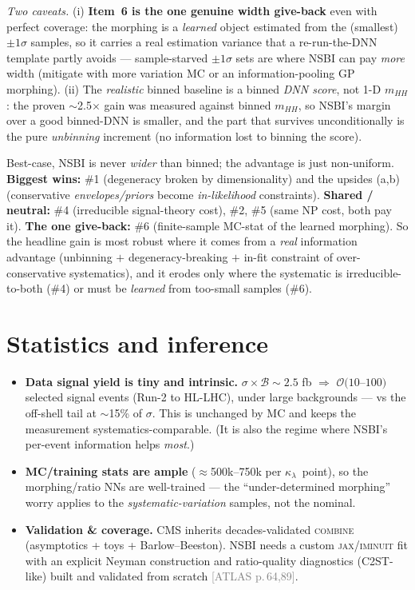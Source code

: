 \documentclass[11pt]{article}
\newcommand{\kl}{\ensuremath{\kappa_\lambda}}
\newcommand{\mhh}{\ensuremath{m_{HH}}}
\newcommand{\pA}[1]{\textcolor{gray}{\small[ATLAS p.\,#1]}}
\begin{document}
\noindent\emph{Two caveats.} (i) \textbf{Item~6 is the one genuine width give-back} even with perfect coverage: the
morphing is a \emph{learned} object estimated from the (smallest) $\pm1\sigma$ samples, so it carries a real
estimation variance that a re-run-the-DNN template partly avoids --- sample-starved $\pm1\sigma$ sets are where NSBI
can pay \emph{more} width (mitigate with more variation MC or an information-pooling GP morphing). (ii) The
\emph{realistic} binned baseline is a binned \emph{DNN score}, not 1-D \mhh: the proven $\sim$2.5$\times$ gain was
measured against binned \mhh, so NSBI's margin over a good binned-DNN is smaller, and the part that survives
unconditionally is the pure \emph{unbinning} increment (no information lost to binning the score).

\begin{takeaway}
Best-case, NSBI is never \emph{wider} than binned; the advantage is just non-uniform. \textbf{Biggest wins:} \#1
(degeneracy broken by dimensionality) and the upsides (a,b) (conservative \emph{envelopes/priors} become
\emph{in-likelihood} constraints). \textbf{Shared / neutral:} \#4 (irreducible signal-theory cost), \#2, \#5 (same
NP cost, both pay it). \textbf{The one give-back:} \#6 (finite-sample MC-stat of the learned morphing). So the
headline gain is most robust where it comes from a \emph{real} information advantage (unbinning $+$
degeneracy-breaking $+$ in-fit constraint of over-conservative systematics), and it erodes only where the systematic
is irreducible-to-both (\#4) or must be \emph{learned} from too-small samples (\#6).
\end{takeaway}

\section{Statistics and inference}
\begin{itemize}
\item \textbf{Data signal yield is tiny and intrinsic.} $\sigma\times\mathcal B\sim2.5$ fb $\Rightarrow$
  $\mathcal O(10$--$100)$ selected signal events (Run-2 to HL-LHC), under large backgrounds --- vs the off-shell
  tail at $\sim$15\% of $\sigma$. This is unchanged by MC and keeps the measurement systematics-comparable. (It is
  also the regime where NSBI's per-event information helps \emph{most}.)
\item \textbf{MC/training stats are ample} ($\approx$500k--750k per \kl\ point), so the morphing/ratio NNs are
  well-trained --- the ``under-determined morphing'' worry applies to the \emph{systematic-variation} samples, not
  the nominal.
\item \textbf{Validation \& coverage.} CMS inherits decades-validated \textsc{combine} (asymptotics + toys +
  Barlow--Beeston). NSBI needs a custom \textsc{jax}/\textsc{iminuit} fit with an explicit Neyman construction and
  ratio-quality diagnostics (C2ST-like) built and validated from scratch \pA{64,89}.
\end{itemize}
\end{document}
